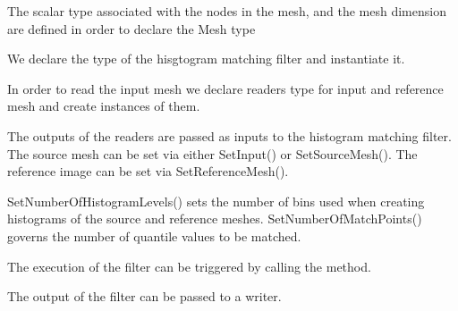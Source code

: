 \documentclass{InsightArticle}
\begin{document}
The scalar type associated with the nodes in the mesh, and the mesh dimension
are defined in order to declare the Mesh type

\begin{center}

\end{center}

We declare the type of the hisgtogram matching filter and instantiate it.

\begin{center}

\end{center}

In order to read the input mesh we declare readers type for input and reference mesh and create instances of them.

\begin{center}

\end{center}

The outputs of the readers are passed as inputs to the histogram matching filter.
The source mesh can be set via either SetInput() or SetSourceMesh().
The reference image can be set via SetReferenceMesh().

\begin{center}

\end{center}

SetNumberOfHistogramLevels() sets the number of bins used when
creating histograms of the source and reference meshes.
SetNumberOfMatchPoints() governs the number of quantile values to be matched.

\begin{center}

\end{center}

The execution of the filter can be triggered by calling the  method.

\begin{center}

\end{center}

The output of the filter can be passed to a writer. 
\end{document}
